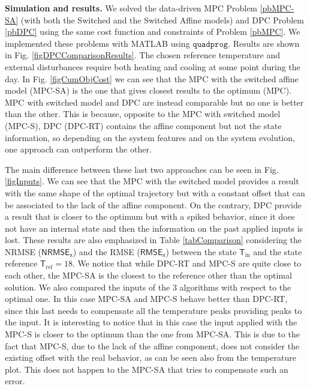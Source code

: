 \documentclass[letterpaper, 10 pt, conference]{ifacconf}  %
\begin{document}
\textbf{Simulation and results.} We solved the data-driven MPC Problem \ref{pbMPC-SA} (with both the Switched and the Switched Affine models) and DPC Problem \ref{pbDPC} using the same cost function and constraints of Problem \ref{pbMPC}. We implemented these problems with MATLAB using $\mathtt{quadprog}$. Results are shown in Fig. \ref{figDPCComparisonResults}. 
The chosen reference temperature and external disturbances require both heating and cooling at some point during the day. In Fig. \ref{figCumObjCost} we can see that the MPC with the switched affine model (MPC-SA) is the one that gives closest results to the optimum (MPC). 
MPC with switched model and DPC are instead comparable but no one is better than the other. This is because, opposite to the MPC with switched model (MPC-S), DPC (DPC-RT) contains the affine component but not the state information, so depending on the system features and on the system evolution, one approach can outperform the other. 

The main difference between these last two approaches can be seen in Fig. \ref{figInputs}. We can see that the MPC with the switched model provides a result with the same shape of the optimal trajectory but with a constant offset that can be associated to the lack of the affine component. On the contrary, DPC provide a result that is closer to the optimum but with a spiked behavior, since it  does not have an internal state and then the information on the past applied inputs is lost. These results are also emphasized in Table \ref{tabComparison} considering the NRMSE ($\mathsf{NRMSE_{x}}$) and the RMSE ($\mathsf{RMSE_{x}}$) between the state $\mathsf{T}_{\mathrm{in}}$ and the state reference $\mathsf{T}_{\mathrm{ref}} = 18$. 
We notice that while DPC-RT and MPC-S are quite close to each other, the MPC-SA is the closest to the reference other than the optimal solution. We also compared the inputs of the $3$ algorithms with respect to the optimal one. 
In this case MPC-SA and MPC-S behave better than DPC-RT, since this last needs to compensate all the temperature peaks providing peaks to the input. 
It is interesting to notice that in this case the input applied with the MPC-S is closer to the optimum than the one from MPC-SA. This is due to the fact that MPC-S, due to the lack of the affine component, does not consider the existing offset with the real behavior, as can be seen also from the temperature plot. This does not happen to the MPC-SA that tries to compensate such an error.
\end{document}
